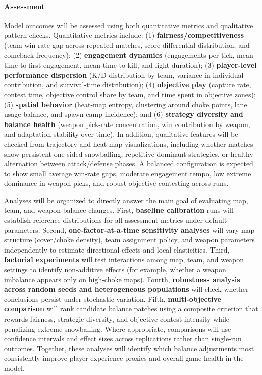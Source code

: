 \documentclass{assignment}
\begin{document}
\paragraph{Assessment}
Model outcomes will be assessed using both quantitative metrics and qualitative pattern checks. Quantitative metrics include: (1) \textbf{fairness/competitiveness} (team win-rate gap across repeated matches, score differential distribution, and comeback frequency); (2) \textbf{engagement dynamics} (engagements per tick, mean time-to-first-engagement, mean time-to-kill, and fight duration); (3) \textbf{player-level performance dispersion} (K/D distribution by team, variance in individual contribution, and survival-time distribution); (4) \textbf{objective play} (capture rate, contest time, objective control share by team, and time spent in objective zones); (5) \textbf{spatial behavior} (heat-map entropy, clustering around choke points, lane usage balance, and spawn-camp incidence); and (6) \textbf{strategy diversity and balance health} (weapon pick-rate concentration, win contribution by weapon, and adaptation stability over time). In addition, qualitative features will be checked from trajectory and heat-map visualizations, including whether matches show persistent one-sided snowballing, repetitive dominant strategies, or healthy alternation between attack/defense phases. A balanced configuration is expected to show small average win-rate gaps, moderate engagement tempo, low extreme dominance in weapon picks, and robust objective contesting across runs.

Analyses will be organized to directly answer the main goal of evaluating map, team, and weapon balance changes. First, \textbf{baseline calibration} runs will establish reference distributions for all assessment metrics under default parameters. Second, \textbf{one-factor-at-a-time sensitivity analyses} will vary map structure (cover/choke density), team assignment policy, and weapon parameters independently to estimate directional effects and local elasticities. Third, \textbf{factorial experiments} will test interactions among map, team, and weapon settings to identify non-additive effects (for example, whether a weapon imbalance appears only on high-choke maps). Fourth, \textbf{robustness analysis across random seeds and heterogeneous populations} will check whether conclusions persist under stochastic variation. Fifth, \textbf{multi-objective comparison} will rank candidate balance patches using a composite criterion that rewards fairness, strategic diversity, and objective contest intensity while penalizing extreme snowballing. Where appropriate, comparisons will use confidence intervals and effect sizes across replications rather than single-run outcomes. Together, these analyses will identify which balance adjustments most consistently improve player experience proxies and overall game health in the model.
\end{document}
